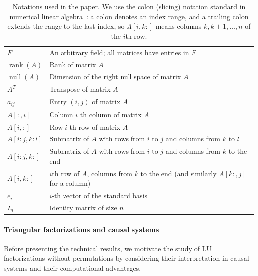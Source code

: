 \documentclass[10pt,twoside]{siamart1116}
\DeclareMathOperator{\rk}{rank}
\DeclareMathOperator{\nl}{null}
\numberwithin{theorem}{section}
\providecommand{\DIFadd}[1]{{\protect\color{blue} \sf #1}} %
\providecommand{\DIFdel}[1]{{\protect\color{red} \scriptsize #1}} %
\providecommand{\DIFaddFL}[1]{\DIFadd{#1}} %
\providecommand{\DIFdelFL}[1]{\DIFdel{#1}} %
\providecommand{\DIFaddbeginFL}{} %
\providecommand{\DIFaddendFL}{} %
\providecommand{\DIFdelbeginFL}{} %
\providecommand{\DIFdelendFL}{} %
\begin{document}
\begin{table}[htbp]
  \centering
  \begin{tabular}{ll}
    \toprule
    \DIFaddbeginFL \DIFaddFL{$F$          }& \DIFaddFL{An arbitrary field; all matrices have entries in $F$ }\\
    \DIFaddendFL $\rk(A)$     & Rank of matrix $A$ \\
    $\nl(A)$     & Dimension of the right null space of matrix $A$ \\
    $A^T$        & Transpose of matrix $A$ \\
    $a_{ij}$     & Entry $(i,j)$ of matrix $A$ \\
    $A[:,i]$     & \DIFdelbeginFL \DIFdelFL{Column }\DIFdelendFL $i$\DIFaddbeginFL \DIFaddFL{th column }\DIFaddendFL of matrix $A$ \\
    $A[i,:]$     & \DIFdelbeginFL \DIFdelFL{Row }\DIFdelendFL $i$\DIFaddbeginFL \DIFaddFL{th row }\DIFaddendFL of matrix $A$ \\
    $A[i:j,k:l]$ & Submatrix of $A$ with rows from $i$ to $j$ and columns from $k$ to $l$ \\
    $A[i:j,k:]$  & Submatrix of $A$ with rows from $i$ to $j$ and columns from $k$ to the end \\
    \DIFaddbeginFL \DIFaddFL{$A[i,k:]$    }& \DIFaddFL{$i$th row of $A$, columns from $k$ to the end (and similarly $A[k:,j]$ for a column) }\\
    \DIFaddendFL $e_i$        & $i$-th vector of the standard basis \\
    $I_n$        & Identity matrix of size $n$ \\
    \bottomrule
  \end{tabular}
  \vspace{5pt}
  \caption{\label{tab:notations} Notations used in the paper. \DIFaddbeginFL \DIFaddFL{We use the colon (slicing) notation standard in numerical linear algebra~\cite{golub_matrix_2013}: a colon denotes an index range, and a trailing colon extends the range to the last index, so $A[i,k:]$ means columns $k, k+1, \ldots, n$ of the $i$th row.}\DIFaddendFL }
\end{table}

\paragraph{Triangular factorizations and causal systems} Before presenting the technical results, we motivate the study of LU factorizations without permutations by considering their interpretation in causal systems and their computational advantages.
\end{document}
